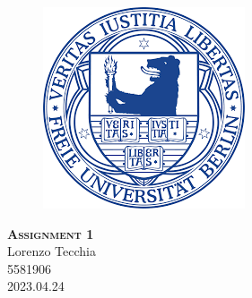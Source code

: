 \documentclass{report}
\begin{document}
\begin{center}
	
\end{center}
    \begin{figure}[htb]
            \centering\includegraphics[width=.5\textwidth]{Immagini/FUlogo.png}
    \end{figure}
    

    \begin{center}
        {\scshape\huge\bfseries Assignment 1}\\
        \LARGE Lorenzo Tecchia \\ 5581906 \\ 2023.04.24
    \end{center}


    \newpage
    
    \tableofcontents
    
	
    
    
    
    \printbibliography
    
\end{document}
